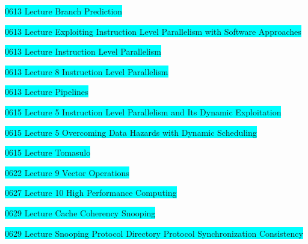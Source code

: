 \documentclass[fontsize=4pt]{scrartcl}
\begin{document}
\colorbox{Cyan}{0613 Lecture Branch Prediction}

\colorbox{Cyan}{0613 Lecture Exploiting Instruction Level Parallelism with Software Approaches}

\colorbox{Cyan}{0613 Lecture Instruction Level Parallelism}

\colorbox{Cyan}{0613 Lecture 8 Instruction Level Parallelism}

\colorbox{Cyan}{0613 Lecture Pipelines}

\colorbox{Cyan}{0615 Lecture 5 Instruction Level Parallelism and Its Dynamic Exploitation}

\colorbox{Cyan}{0615 Lecture 5 Overcoming Data Hazards with Dynamic Scheduling}

\colorbox{Cyan}{0615 Lecture Tomasulo}

\colorbox{Cyan}{0622 Lecture 9 Vector Operations}

\colorbox{Cyan}{0627 Lecture 10 High Performance Computing}

\colorbox{Cyan}{0629 Lecture Cache Coherency Snooping}

\colorbox{Cyan}{0629 Lecture Snooping Protocol Directory Protocol Synchronization Consistency}
\end{document}
